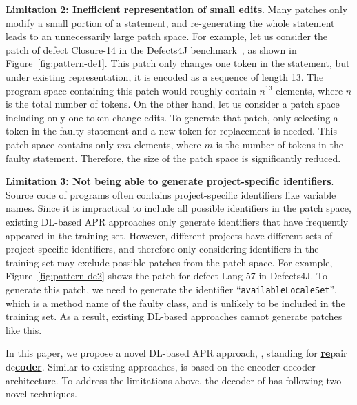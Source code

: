 {\bf Limitation 2: Inefficient representation of small edits}.
Many patches only modify a small portion of a statement, and re-generating the whole statement leads to an unnecessarily large patch space. For example, let us consider the patch of defect Closure-14 in the Defects4J benchmark~\cite{defects4j}, as shown in Figure~\ref{fig:pattern-de1}. This patch only changes one token in the statement, but under existing representation, it is encoded as a sequence of length 13. The program space containing this patch would roughly contain $n^{13}$ elements, where $n$ is the total number of tokens. On the other hand, let us consider a patch space including only one-token change edits. To generate that patch, only selecting a token in the faulty statement and a new token for replacement is needed. This patch space contains only $mn$ elements, where $m$ is the number of tokens in the faulty statement. Therefore, the size of the patch space is significantly reduced.

{\bf Limitation 3: Not being able to generate project-specific identifiers}. Source code of programs often contains project-specific identifiers like variable names. Since it is impractical to include all possible identifiers in the patch space, existing DL-based APR approaches only generate identifiers that have frequently appeared in the training set. However, different projects have different sets of project-specific identifiers, and therefore only considering identifiers in the training set may exclude possible patches from the patch space. For example, Figure~\ref{fig:pattern-de2} shows the patch for defect Lang-57 in Defects4J. To generate this patch, we need to generate the identifier ``{\tt availableLocaleSet}'', which is a method name of the faulty class, and is unlikely to be included in the training set. As a result, existing DL-based approaches cannot generate patches like this. 

\smallskip
In this paper, we propose a novel DL-based APR approach, \techname, standing for \underline{\textbf{re}}pair de\underline{\textbf{coder}}. Similar to existing approaches, \techname is based on the encoder-decoder architecture. To address the limitations above, the decoder of \techname has following two novel techniques.

